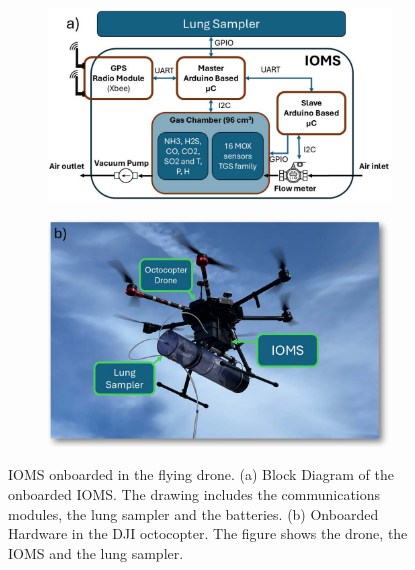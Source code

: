 \documentclass[final,3p,times,twocolumn]{elsarticle}
\begin{document}
\begin{figure}[ht!]
    \centering
    \begin{subfigure}[b]{\columnwidth}
        \centering
        \includegraphics[width=\linewidth]{fig1a_2.pdf}
        \label{fig:ioms_a}
    \end{subfigure}
    
    \begin{subfigure}[b]{\columnwidth}
        \centering
        \includegraphics[width=\linewidth]{fig1b_2.pdf}
        \label{fig:ioms_b}
    \end{subfigure}
    
    \caption{IOMS onboarded in the flying drone. (a) Block Diagram of the onboarded IOMS. The drawing includes the communications modules, the lung sampler and the batteries. (b) Onboarded Hardware in the DJI octocopter. The figure shows the drone, the IOMS and the lung sampler.}
    \label{fig:ioms}
\end{figure}
\end{document}
